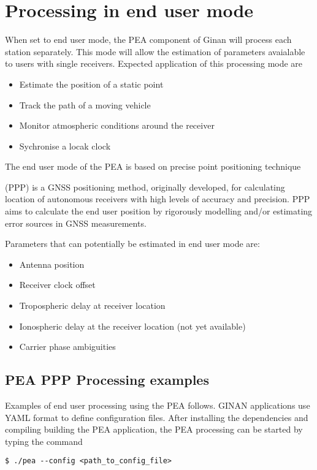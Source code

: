 \chapter{Processing in end user mode}
When set to end user mode, the PEA component of Ginan will process each station separately. This mode will allow the estimation of parameters avaialable to users with single receivers. Expected application of this processing mode are
\begin{itemize}
	\item Estimate the position of a static point
	\item Track the path of a moving vehicle
	\item Monitor atmospheric conditions around the receiver
	\item Sychronise a locak clock
\end{itemize}
The end user  mode of the PEA is based on precise point positioning technique

(PPP) is a GNSS positioning method, originally developed, for calculating location of autonomous receivers with high levels of accuracy and precision. PPP aims to calculate the end user position by rigorously modelling and/or estimating error sources in GNSS measurements. 


Parameters that can potentially be estimated in end user mode are:
\begin{itemize}
	\item Antenna position
	\item Receiver clock offset
	\item Tropospheric delay at receiver location
	\item Ionospheric delay at the receiver location (not yet available)
	\item Carrier phase ambiguities
\end{itemize}

\section{PEA PPP Processing examples}
Examples of end user processing using the PEA follows. GINAN applications use YAML format to define configuration files. After installing the dependencies and compiling building the PEA application, the PEA processing can be started by typing the command 
\begin{verbatim}
$ ./pea --config <path_to_config_file>
\end{verbatim}

